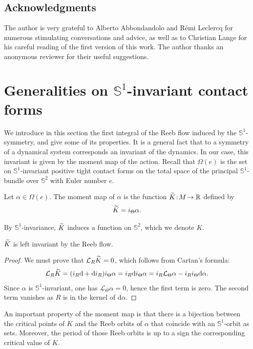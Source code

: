 \documentclass[AHL,Unicode,longabstracts]{cedram}
\newcommand{\bbS}{\mathbb{S}}
\newcommand{\bbR}{\mathbb{R}}
\newcommand{\clL}{\mathcal{L}}
\newcommand{\rmd}{\mathrm{d}}
\renewcommand*{\to}{\mathchoice{\longrightarrow}{\rightarrow}{\rightarrow}{\rightarrow}}
\let\oldtilde\tilde
\renewcommand*{\tilde}[1]{\mathchoice{\widetilde{#1}}{\widetilde{#1}}{\oldtilde{#1}}{\oldtilde{#1}}}
\newcommand{\bbS}{\mathbb{S}}
\begin{document}
\subsection*{Acknowledgments}
The author is very grateful to Alberto Abbondandolo and Rémi Leclercq for numerous stimulating conversations and advice, as well as to Christian Lange for his careful reading of the first version of this work. The author thanks an anonymous reviewer for their useful suggestions.

\section{Generalities on \texorpdfstring{$\bbS^1$}{S1}-invariant contact forms}\label{sec:generalites}
We introduce in this section the first integral of the Reeb flow induced by the $\bbS^1$-symmetry, and give some of its properties. It is a general fact that to a symmetry of a dynamical system corresponds an invariant of the dynamics. In our case, this invariant is given by the moment map of the action. Recall that $\Omega(e)$ is the set on $\bbS^1$-invariant positive tight contact forms on the total space of the principal $\bbS^1$-bundle over $\bbS^2$ with Euler number $e$.

\begin{defi}%
\!\!
Let $\alpha\! \in\! \Omega(e)$. The moment map of $\alpha$ is the function $\tilde K\! :\! M\! \to \bbR$ defined by
\[
\tilde K = i_{\Theta} \alpha.
\]
\end{defi}

By $\bbS^1$-invariance, $\tilde K$ induces a function on $\bbS^2$, which we denote $K$.

\begin{prop}\label{prop:K_invariant}
$\tilde K$ is left invariant by the Reeb flow.
\end{prop}

\begin{proof}
We must prove that $\clL_R \tilde K = 0$, which follows from Cartan's formula:
\[
\clL_R \tilde K = (i_R \rmd  + \rmd i_R)i_\Theta \alpha = i_R \rmd  i_\Theta \alpha = i_R \clL_\Theta \alpha - i_R i_\Theta \rmd \alpha.
\]
Since $\alpha$ is $\bbS^1$-invariant, one has $\clL_\Theta \alpha = 0$, hence the first term is zero. The second term vanishes as $R$ is in the kernel of $\rmd \alpha$.
\end{proof}

An important property of the moment map is that there is a bijection between the critical points of $K$ and the Reeb orbits of $\alpha$ that coincide with an $\bbS^1$-orbit as sets. Moreover, the period of those Reeb orbits is up to a sign the corresponding critical value of $K$.
\end{document}
